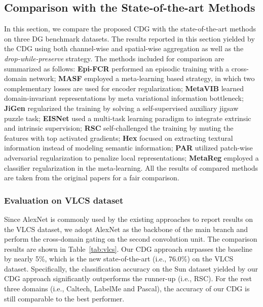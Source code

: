 \subsection{Comparison with the State-of-the-art Methods}
In this section, we compare the proposed CDG with the state-of-the-art methods on three DG benchmark datasets. The results reported in this section yielded by the CDG using both channel-wise and spatial-wise aggregation as well as the \textit{drop-while-preserve} strategy. The methods included for comparison are summarized as follows:  \textbf{Epi-FCR} \citep{li2019episodic} performed an episodic training with a cross-domain network; \textbf{MASF} \citep{dou2019domain} employed a meta-learning based strategy, in which two complementary losses are used for encoder regularization; \textbf{MetaVIB} \citep{zhou2020learning} learned domain-invariant representations by meta variational information bottleneck; \textbf{JiGen} \citep{carlucci2019domain} regularized the training by solving a self-supervised auxiliary jigsaw puzzle task; \textbf{EISNet} \citep{wang2020learning} used a multi-task learning paradigm to integrate extrinsic and intrinsic supervision; \textbf{RSC} \citep{huangRSC2020} self-challenged the training by muting the features with top activated gradients; \textbf{Hex} \citep{wang2019learning1} focused on extracting textural information instead of modeling semantic information; \textbf{PAR} \citep{wang2019learning} utilized patch-wise adversarial regularization to penalize local representations; \textbf{MetaReg} \citep{balaji2018metareg} employed a classifier regularization in the meta-learning. All the results of compared methods are taken from the original papers for a fair comparison. 



\subsubsection{Evaluation on VLCS dataset}
\label{sec:vlcs}
Since AlexNet is commonly used by the existing approaches to report results on the VLCS dataset, we adopt AlexNet as the backbone of the main branch and perform the cross-domain gating on the second convolution unit. The comparison results are shown in Table~\ref{tab:vlcs}. Our CDG approach surpasses the baseline by nearly 5\%, which is the new state-of-the-art (i.e., 76.0\%) on the VLCS dataset. Specifically, the classification accuracy on the Sun dataset yielded by our CDG approach significantly outperforms the runner-up (i.e., RSC). For the rest three domains (i.e., Caltech, LabelMe and Pascal), the accuracy of our CDG is still comparable to the best performer.



